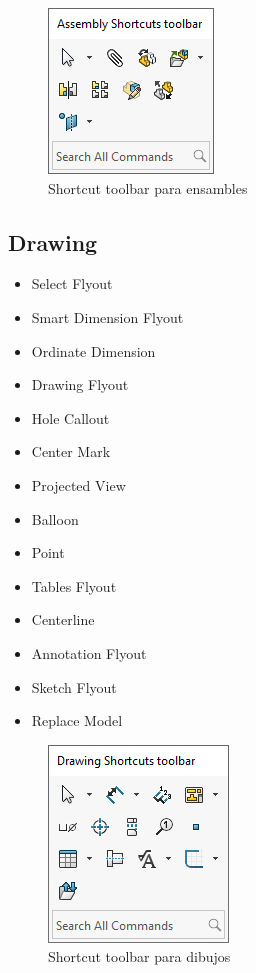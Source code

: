 \documentclass{report}
\begin{document}
\begin{figure}[H]
	\centering
	\includegraphics[width=0.35\linewidth, height=0.4\textheight,keepaspectratio]{Imagenes/solidworks_shortcutbars_04}
	\caption{Shortcut toolbar para ensambles}
	\label{fig:solidworksshortcutbars04}
\end{figure}

\subsection{Drawing}

\begin{itemize}
	\item Select Flyout
	\item Smart Dimension Flyout
	\item Ordinate Dimension
	\item Drawing Flyout
	\item Hole Callout
	\item Center Mark
	\item Projected View
	\item Balloon
	\item Point
	\item Tables Flyout
	\item Centerline
	\item Annotation Flyout
	\item Sketch Flyout
	\item Replace Model

\end{itemize}

\begin{figure}[H]
	\centering
	\includegraphics[width=0.45\linewidth, height=0.45\textheight,keepaspectratio]{Imagenes/solidworks_shortcutbars_05}
	\caption{Shortcut toolbar para dibujos}
	\label{fig:solidworksshortcutbars05}
\end{figure}
\end{document}
